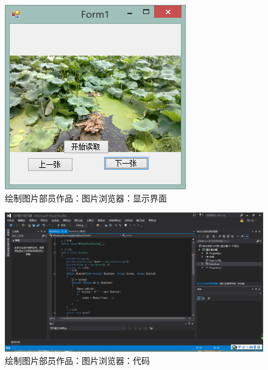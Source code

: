 \documentclass[]{report}
\begin{document}
\begin{enumerate}
\begin{itemize}
\begin{figure}
\includegraphics[width=0.7\linewidth]{./PIC/DengPic2}
\caption{绘制图片部员作品：图片浏览器：显示界面}
\label{fig:DengPic0}
\end{figure}
\begin{figure}
\centering
\includegraphics[width=1\linewidth]{./PIC/DengPic3}
\caption{绘制图片部员作品：图片浏览器：代码}
\label{fig:DengPic0}
\end{figure}
	\end{itemize}
\end{enumerate}
\end{document}
